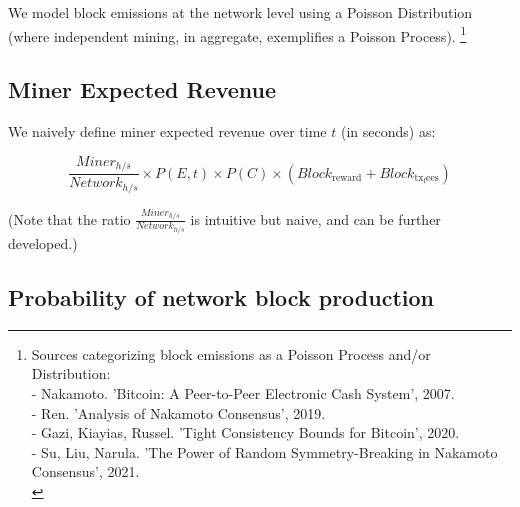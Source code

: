 \documentclass[11pt]{article}
\theoremstyle{plain}
\begin{document}
{We model block emissions at the network level using a Poisson Distribution
(where independent mining, in aggregate, exemplifies a Poisson Process).\nolinebreak
\footnote{
Sources categorizing block emissions as a Poisson Process and/or Distribution: \\
    - Nakamoto. 'Bitcoin: A Peer-to-Peer Electronic Cash System', 2007.\\
    - Ren. 'Analysis of Nakamoto Consensus', 2019.\\
    - Gazi, Kiayias, Russel. 'Tight Consistency Bounds for Bitcoin', 2020.\\
    - Su, Liu, Narula. 'The Power of Random Symmetry-Breaking in Nakamoto Consensus', 2021.\\
}

\subsection{\normalsize{Miner Expected Revenue}}

We naively define miner expected revenue over time $t$ (in seconds) as:

\newcommand{\minerHashrate}{Miner_{h/s}}
\newcommand{\networkHashrate}{Network_{h/s}}
\newcommand{\blockReward}{Block_\mathrm{reward}}
\newcommand{\blockTransactionFees}{Block_\mathrm{tx_fees}}

\begin{equation}
\frac{\minerHashrate}{\networkHashrate}
\times
P(E,t)
\times
P(C)
\times
(\blockReward + \blockTransactionFees)
\end{equation}

(Note that the ratio $\frac{\minerHashrate}{\networkHashrate}$ is intuitive but
naive, and can be further developed.)

\subsection{\normalsize{Probability of network block production}}

}
\end{document}
